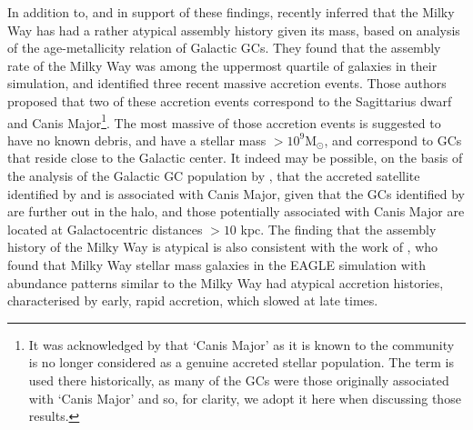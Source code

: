 In addition to, and in support of these findings,
\citet{2018MNRAS.tmp.1537K} recently inferred that the Milky Way
has had a rather atypical assembly history given its mass, based
on analysis of the age-metallicity relation of Galactic GCs. They
found that the assembly rate of the Milky Way was among the uppermost
quartile of galaxies in their simulation, and identified three
recent massive accretion events. Those authors proposed that two of these accretion events correspond to the Sagittarius
dwarf and Canis Major\footnote{It was acknowledged by \citet{2018MNRAS.tmp.1537K} that `Canis Major' as it is known to the community is no longer considered as a genuine accreted stellar population. The term is used there historically, as many of the GCs were those originally associated with `Canis Major' and so, for clarity, we adopt it here when discussing those results.}. The most massive of those
accretion events is suggested to have no known debris, and have a
stellar mass $> 10^9 \mathrm{M_\odot}$, and correspond to GCs that
reside close to the Galactic center.  It indeed may be
possible, on the basis of the analysis of the Galactic GC population
by \citet{2018MNRAS.tmp.1537K}, that the accreted satellite
identified by \citet{2018MNRAS.478..611B} and \citet{2018ApJ...860L..11K} is associated with Canis Major, given that the GCs
identified by \citet{2018arXiv180500453M} are further out in the
halo, and those potentially associated with Canis Major
are located at Galactocentric distances $> 10$ kpc.  The finding
that the assembly history of the Milky Way is atypical is also
consistent with the work of \citet{2018MNRAS.477.5072M}, who found
that Milky Way stellar mass galaxies in the EAGLE simulation with
\afe{} abundance patterns similar to the Milky Way had
atypical accretion histories, characterised by early, rapid
accretion, which slowed at late times.

